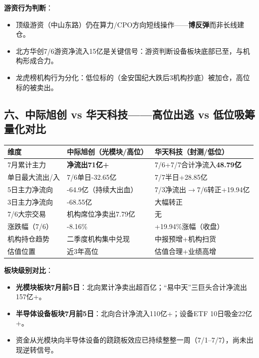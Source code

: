 \documentclass[a4paper,11pt,fontset=none]{ctexart}
\begin{document}
\textbf{游资行为判断}：
\begin{itemize}
  \item 顶级游资（中山东路）仍在算力/CPO方向短线操作——\textbf{博反弹}而非长线建仓。
  \item 北方华创7/6游资净流入15亿是关键信号：游资判断设备板块底部已至，与机构形成合力。
  \item 龙虎榜机构行为分化：低位标的（金安国纪大跌后3机构抄底）被加仓，高位标的被卖出。
\end{itemize}

\subsection*{六、中际旭创 vs 华天科技——高位出逃 vs 低位吸筹量化对比}

\begin{exhibitbox}
\begin{tabularx}{\textwidth}{L{3cm}L{4cm}L{4cm}}
\toprule
\textbf{维度} & \textbf{中际旭创（光模块/高位）} & \textbf{华天科技（封测/低位）} \\
\midrule
7月累计主力 & \textbf{净流出71亿+} & 7/6+7/7合计净流入\textbf{48.79亿} \\
单日最大流出/入 & 7/6单日-32.65亿 & 7/7半日+28.85亿 \\
5日主力净流向 & -64.9亿（持续大出血） & 7/3净流出$\to$7/6转正+19.94亿 \\
3日主力净流向 & -68.55亿 & 大幅转正 \\
7/6大宗交易 & 机构席位净卖出7.79亿 & 无 \\
涨跌幅（7/6） & -8.16\% & +19.94\%涨幅（收盘） \\
机构持仓趋势 & 二季度机构集中兑现 & 中报预增+机构扫货 \\
估值位置 & 近3年高位 & 估值合理+业绩高增 \\
\bottomrule
\end{tabularx}
\end{exhibitbox}

\textbf{板块级别对比}：
\begin{itemize}
  \item \textbf{光模块板块7月前5日}：北向累计净卖出超百亿；``易中天''三巨头合计净流出157亿+。
  \item \textbf{半导体设备板块7月前5日}：北向合计净流入110亿+；设备ETF 10日吸金22亿+。
  \item 资金从光模块向半导体设备的跷跷板效应已持续整整一周（7/1--7/7），尚未出现逆转信号。
\end{itemize}
\end{document}
